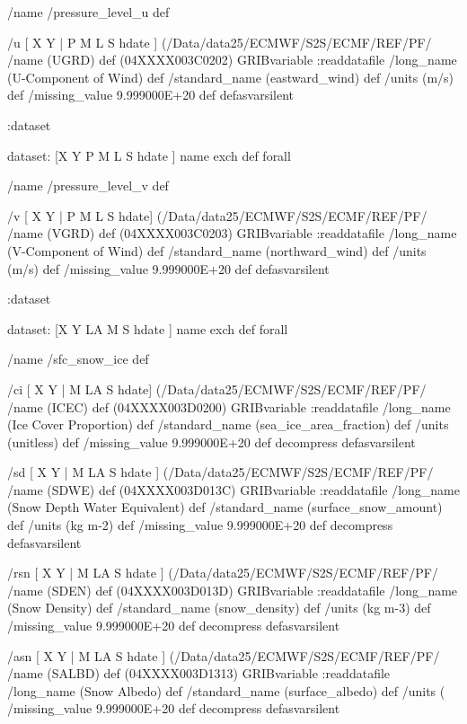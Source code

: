 \begin{ingrid}
{/name /pressure_level_u def

/u { [ X Y | P M L S hdate ] (/Data/data25/ECMWF/S2S/ECMF/REF/PF/%
/name (UGRD) def
(04XXXX003C0202) GRIBvariable
:readdatafile
/long_name (U-Component of Wind) def
/standard_name (eastward_wind) def
/units (m/s) def
/missing_value 9.999000E+20 def
} defasvarsilent

:dataset

dataset:
[X Y P M L S hdate ] {name exch def } forall

/name /pressure_level_v def

/v { [ X Y | P M L S hdate] (/Data/data25/ECMWF/S2S/ECMF/REF/PF/%
/name (VGRD) def
(04XXXX003C0203) GRIBvariable
:readdatafile
/long_name (V-Component of Wind) def
/standard_name (northward_wind) def
/units (m/s) def
/missing_value 9.999000E+20 def
} defasvarsilent

:dataset

dataset:
[X Y LA M S hdate ] {name exch def } forall

/name /sfc_snow_ice def

/ci { [ X Y | M LA S hdate] (/Data/data25/ECMWF/S2S/ECMF/REF/PF/%
/name (ICEC) def
(04XXXX003D0200) GRIBvariable
:readdatafile
/long_name (Ice Cover Proportion) def
/standard_name (sea_ice_area_fraction) def
/units (unitless) def
/missing_value 9.999000E+20 def
decompress
} defasvarsilent

/sd { [ X Y | M LA S hdate ] (/Data/data25/ECMWF/S2S/ECMF/REF/PF/%
/name (SDWE) def
(04XXXX003D013C) GRIBvariable
:readdatafile
/long_name (Snow Depth Water Equivalent) def
/standard_name (surface_snow_amount) def 
/units (kg m-2) def
/missing_value 9.999000E+20 def
decompress
} defasvarsilent

/rsn { [ X Y | M LA S hdate ] (/Data/data25/ECMWF/S2S/ECMF/REF/PF/%
/name (SDEN) def
(04XXXX003D013D) GRIBvariable
:readdatafile
/long_name (Snow Density) def
/standard_name (snow_density) def
/units (kg m-3) def
/missing_value 9.999000E+20 def
decompress
} defasvarsilent

/asn { [ X Y | M LA S hdate ] (/Data/data25/ECMWF/S2S/ECMF/REF/PF/%
/name (SALBD) def
(04XXXX003D1313) GRIBvariable
:readdatafile
/long_name (Snow Albedo) def
/standard_name (surface_albedo) def
/units (%
/missing_value 9.999000E+20 def
decompress
} defasvarsilent

}
\end{ingrid}
